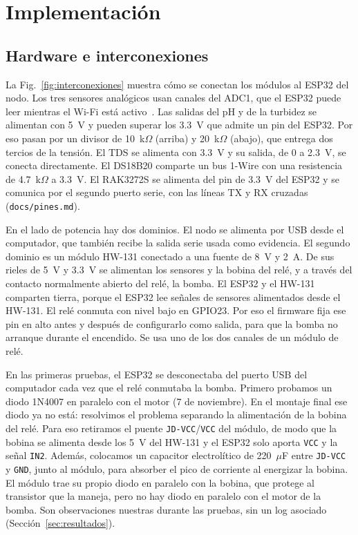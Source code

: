 \section{Implementación}
\label{sec:implementacion}

\subsection{Hardware e interconexiones}
\label{sec:interconexiones}

La Fig.~\ref{fig:interconexiones} muestra cómo se conectan los módulos al ESP32 del nodo. Los tres sensores analógicos usan canales del ADC1, que el ESP32 puede leer mientras el Wi-Fi está activo~\cite{esp32}. Las salidas del pH y de la turbidez se alimentan con 5~V y pueden superar los 3.3~V que admite un pin del ESP32. Por eso pasan por un divisor de 10~k$\Omega$ (arriba) y 20~k$\Omega$ (abajo), que entrega dos tercios de la tensión. El TDS se alimenta con 3.3~V y su salida, de 0 a 2.3~V, se conecta directamente. El DS18B20 comparte un bus 1-Wire con una resistencia de 4.7~k$\Omega$ a 3.3~V. El RAK3272S se alimenta del pin de 3.3~V del ESP32 y se comunica por el segundo puerto serie, con las líneas TX y RX cruzadas (\texttt{docs/pines.md}).

En el lado de potencia hay dos dominios. El nodo se alimenta por USB desde el computador, que también recibe la salida serie usada como evidencia. El segundo dominio es un módulo HW-131 conectado a una fuente de 8~V y 2~A. De sus rieles de 5~V y 3.3~V se alimentan los sensores y la bobina del relé, y a través del contacto normalmente abierto del relé, la bomba. El ESP32 y el HW-131 comparten tierra, porque el ESP32 lee señales de sensores alimentados desde el HW-131. El relé conmuta con nivel bajo en GPIO23. Por eso el firmware fija ese pin en alto antes y después de configurarlo como salida, para que la bomba no arranque durante el encendido. Se usa uno de los dos canales de un módulo de relé.

En las primeras pruebas, el ESP32 se desconectaba del puerto USB del computador cada vez que el relé conmutaba la bomba. Primero probamos un diodo 1N4007 en paralelo con el motor (7 de noviembre). En el montaje final ese diodo ya no está: resolvimos el problema separando la alimentación de la bobina del relé. Para eso retiramos el puente \texttt{JD-VCC}/\texttt{VCC} del módulo, de modo que la bobina se alimenta desde los 5~V del HW-131 y el ESP32 solo aporta \texttt{VCC} y la señal \texttt{IN2}. Además, colocamos un capacitor electrolítico de 220~$\mu$F entre \texttt{JD-VCC} y \texttt{GND}, junto al módulo, para absorber el pico de corriente al energizar la bobina. El módulo trae su propio diodo en paralelo con la bobina, que protege al transistor que la maneja, pero no hay diodo en paralelo con el motor de la bomba. Son observaciones nuestras durante las pruebas, sin un log asociado (Sección~\ref{sec:resultados}).

